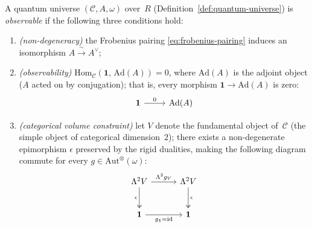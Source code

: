 \begin{definition}
\label{def:quantum-observable-universe}
\leanok
A quantum universe $(\mathcal{C}, A, \omega)$ over~$R$
(Definition~\ref{def:quantum-universe}) is \emph{observable} if the
following three conditions hold:
\begin{enumerate}
  \item \emph{(non-degeneracy)} the Frobenius pairing
        \eqref{eq:frobenius-pairing} induces an isomorphism
        $A \xrightarrow{\;\sim\;} A^{\vee}$;
  \item \emph{(observability)} $\mathrm{Hom}_{\mathcal{C}}(\mathbf{1},\,
        \mathrm{Ad}(A)) = 0$, where $\mathrm{Ad}(A)$ is the adjoint object
        ($A$ acted on by conjugation); that is, every morphism
        $\mathbf{1} \to \mathrm{Ad}(A)$ is zero:
        \[
        \begin{tikzcd}[column sep=2.5em]
          \mathbf{1} \ar[r, "0"] & \mathrm{Ad}(A)
        \end{tikzcd}
        \]
  \item \emph{(categorical volume constraint)}
        \label{def:categorical-volume-constraint}
        let $V$ denote the fundamental object of~$\mathcal{C}$ (the simple
        object of categorical dimension~$2$); there exists a
        non-degenerate epimorphism $\epsilon$ preserved by the rigid
        dualities, making the following diagram commute for every
        $g \in \mathrm{Aut}^{\otimes}(\omega)$:
        \begin{equation}\label{eq:categorical-volume-constraint}
        \begin{tikzcd}[row sep=2.5em, column sep=3em]
          \Lambda^2 V \ar[r, "\Lambda^2 g_V"]
                      \ar[d, "\epsilon"', two heads]
          & \Lambda^2 V \ar[d, "\epsilon", two heads]
          \\
          \mathbf{1} \ar[r, "g_{\mathbf{1}} = \mathrm{id}"']
          & \mathbf{1}
        \end{tikzcd}
        \end{equation}
\end{enumerate}
\end{definition}

